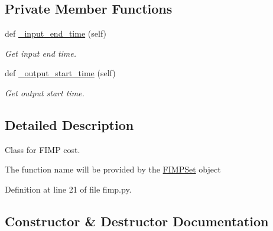 \subsection*{Private Member Functions}
\begin{DoxyCompactItemize}
\item 
def \hyperlink{classsylva_1_1base_1_1fimp_1_1_f_i_m_p_cost_ab5c4e28ac7b7fb3fd3e14a66a564e989}{\+\_\+input\+\_\+end\+\_\+time} (self)
\begin{DoxyCompactList}\small\item\em Get input end time. \end{DoxyCompactList}\item 
def \hyperlink{classsylva_1_1base_1_1fimp_1_1_f_i_m_p_cost_a162a87e8f45b84a27b8c7e2503539122}{\+\_\+output\+\_\+start\+\_\+time} (self)
\begin{DoxyCompactList}\small\item\em Get output start time. \end{DoxyCompactList}\end{DoxyCompactItemize}


\subsection{Detailed Description}
Class for F\+I\+MP cost. 

The function name will be provided by the \hyperlink{classsylva_1_1base_1_1fimp_1_1_f_i_m_p_set}{F\+I\+M\+P\+Set} object 

Definition at line 21 of file fimp.\+py.



\subsection{Constructor \& Destructor Documentation}
\mbox{\label{classsylva_1_1base_1_1fimp_1_1_f_i_m_p_cost_ae6a202c864a8f1427483d759878512aa}} 

